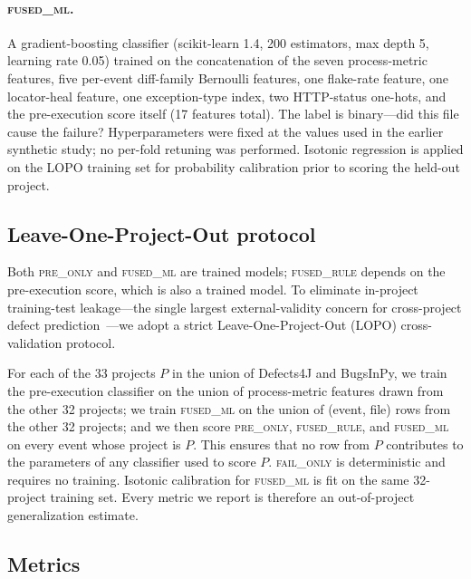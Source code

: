 \documentclass[preprint,12pt]{elsarticle}
\begin{document}
\paragraph{\textsc{fused\_ml}.} A gradient-boosting classifier (scikit-learn 1.4, 200 estimators, max depth 5, learning rate 0.05) trained on the concatenation of the seven process-metric features, five per-event diff-family Bernoulli features, one flake-rate feature, one locator-heal feature, one exception-type index, two HTTP-status one-hots, and the pre-execution score itself (17 features total). The label is binary---did this file cause the failure? Hyperparameters were fixed at the values used in the earlier synthetic study; no per-fold retuning was performed. Isotonic regression is applied on the LOPO training set for probability calibration prior to scoring the held-out project.

\subsection{Leave-One-Project-Out protocol}
\label{sec:methods-lopo}

Both \textsc{pre\_only} and \textsc{fused\_ml} are trained models; \textsc{fused\_rule} depends on the pre-execution score, which is also a trained model. To eliminate in-project training-test leakage---the single largest external-validity concern for cross-project defect prediction~\cite{zimmermann2009,tantithamthavorn2017}---we adopt a strict Leave-One-Project-Out (LOPO) cross-validation protocol.

For each of the 33 projects $P$ in the union of Defects4J and BugsInPy, we train the pre-execution classifier on the union of process-metric features drawn from the other 32 projects; we train \textsc{fused\_ml} on the union of (event, file) rows from the other 32 projects; and we then score \textsc{pre\_only}, \textsc{fused\_rule}, and \textsc{fused\_ml} on every event whose project is $P$. This ensures that no row from $P$ contributes to the parameters of any classifier used to score $P$. \textsc{fail\_only} is deterministic and requires no training. Isotonic calibration for \textsc{fused\_ml} is fit on the same 32-project training set. Every metric we report is therefore an out-of-project generalization estimate.

\subsection{Metrics}
\label{sec:methods-metrics}
\end{document}
